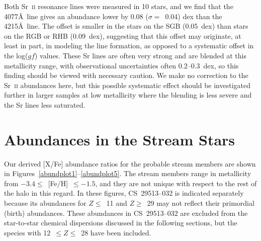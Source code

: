 \documentclass{emulateapj}
\begin{document}
Both Sr~\textsc{ii} resonance lines 
were measured in 10 stars, and we find that the
4077\AA\ line gives an abundance lower by 0.08 ($\sigma =$~0.04) dex
than the 4215\AA\ line.
The offset is smaller in the stars on the SGB (0.05~dex)
than stars on the RGB or RHB (0.09~dex), suggesting that 
this offset may originate, at least in part, in modeling the
line formation, as opposed to a systematic offset in the log($gf$) values.
These Sr lines are often very strong and are blended at this
metallicity range, with observational uncertainties often 0.2--0.3~dex,
so this finding should be viewed with necessary caution.
We make no correction to the Sr~\textsc{ii} abundances here, but 
this possible systematic effect should be investigated further
in larger samples at low metallicity where the blending is less severe
and the Sr lines less saturated.


\section{Abundances in the Stream Stars}
\label{results}


Our derived [X/Fe] abundance ratios for the probable
stream members are shown in
Figures~\ref{abundplot1}--\ref{abundplot5}.
The stream members range in metallicity from 
$-3.4 \leq$~[Fe/H]~$\leq -1.5$, and they are not unique
with respect to the rest of the halo in this regard.
In these figures, \mbox{CS~29513--032} is indicated 
separately because its abundances for $Z \leq$~11 and
$Z \geq$~29 may not reflect their primordial (birth) abundances.
These abundances in \mbox{CS~29513--032}
are excluded from the star-to-star chemical
dispersions discussed in the following sections, but the
species with 12~$\leq Z \leq$~28 have been included.
\end{document}
